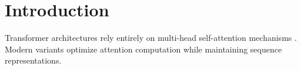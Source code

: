 \documentclass{article}
\begin{document}
\section{Introduction}
\label{sec:intro}
Transformer architectures rely entirely on multi-head self-attention mechanisms \cite{vaswani2017}.
Modern variants optimize attention computation while maintaining sequence representations.
\end{document}
